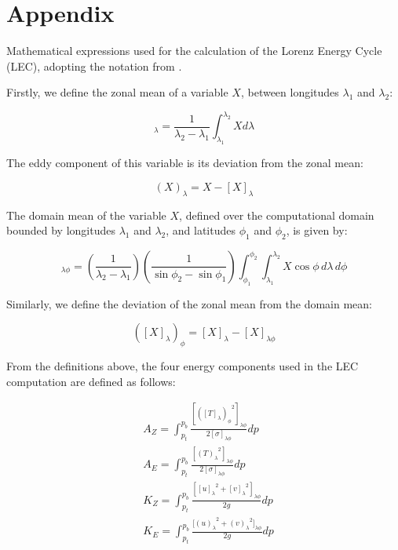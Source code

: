 \documentclass[pdflatex,sn-chicago]{sn-jnl}%
\theoremstyle{plain}
\theoremstyle{definition}
\theoremstyle{remark}
\theoremstyle{definition}
\begin{document}
\section*{Appendix}


Mathematical expressions used for the calculation of the Lorenz Energy Cycle (LEC), adopting the notation from \citet{michaelides1987limited}. 


Firstly, we define the zonal mean of a variable $X$, between longitudes $\lambda_{1}$ and $\lambda_{2}$:

 \begin{equation}
     [X]_\lambda = \frac{1}{\lambda_2 - \lambda_1} \int_{\lambda_1}^{\lambda_2} X d\lambda
 \end{equation}

The eddy component of this variable is its deviation from the zonal mean:

\begin{equation}
    (X)_\lambda =  X - [X]_\lambda
\end{equation}

The domain mean of the variable $X$, defined over the computational domain bounded by longitudes $\lambda_1$ and $\lambda_2$, and latitudes $\phi_1$ and $\phi_2$, is given by:

\begin{equation}
    [X]_{\lambda\phi} = \left(\frac{1}{\lambda_2 - \lambda_1}\right)  \left(\frac{1}{\sin\phi_2 - \sin\phi_1}\right)  \int_{\phi_1}^{\phi_2} \int_{\lambda_1}^{\lambda_2} X \cos\phi\,d\lambda\,d\phi
\end{equation}

Similarly, we define the deviation of the zonal mean from the domain mean:

\begin{equation}
    ([X]_\lambda)_\phi = [X]_\lambda - [X]_{\lambda\phi}
\end{equation}

From the definitions above, the four energy components used in the LEC computation are defined as follows:

\begin{align}
   &A_Z = \int_{p_t}^{p_b} \frac{[{([T]_\lambda)_\phi}^{2}]_{\lambda \phi}}{2[\sigma]_{\lambda \phi}} dp \label{eq:AZ} \\
   &A_E = \int_{p_t}^{p_b} \frac{[{(T)_\lambda}^{2}]_{\lambda \phi}}{2[\sigma]_{\lambda \phi}} dp \label{eq:AE} \\
   &K_Z =  \int_{p_t}^{p_b} \frac{[{[u]_\lambda}^2 + {[v]_\lambda}^2]_{\lambda \phi}}{2g} dp \label{eq:KZ} \\
   &K_E =  \int_{p_t}^{p_b} \frac{{[(u)_\lambda}^2 + {(v)_\lambda}^2]_{\lambda \phi}}{2g} dp \label{eq:KE}
\end{align}
\end{document}
